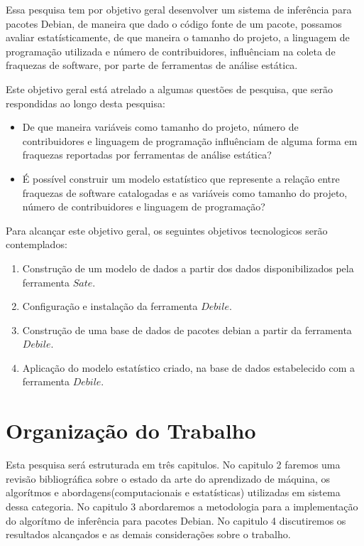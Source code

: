         Essa pesquisa tem por objetivo geral desenvolver um sistema de inferência para pacotes Debian, de maneira que dado o código fonte de um pacote, possamos avaliar estatísticamente, de que maneira o tamanho do projeto, a linguagem de programação utilizada e número de contribuidores, influênciam na coleta de fraquezas de software, por parte de ferramentas de análise estática.

        Este objetivo geral está atrelado a algumas questões de pesquisa, que serão respondidas ao longo desta pesquisa:
        \begin{itemize}
                \item De que maneira variáveis como tamanho do projeto, número de contribuidores e linguagem de programação influênciam de alguma forma em fraquezas reportadas por ferramentas de análise estática?
                \item É possível construir um modelo estatístico que represente a relação entre fraquezas de software catalogadas e as variáveis como tamanho do projeto, número de contribuidores e linguagem de programação?
        \end{itemize}

        Para alcançar este objetivo geral, os seguintes objetivos tecnologicos serão contemplados:
                \begin{enumerate}
                        \item Construção de um modelo de dados a partir dos dados disponibilizados pela ferramenta $Sate$.
                        \item Configuração e instalação da ferramenta $Debile$.
                        \item Construção de uma base de dados de pacotes debian a partir da ferramenta $Debile$.
                        \item Aplicação do modelo estatístico criado, na base de dados estabelecido com a ferramenta $Debile$.
                \end{enumerate}

\section{Organização do Trabalho}

        Esta pesquisa será estruturada em três capitulos. No capitulo 2 faremos uma revisão bibliográfica sobre o estado da arte do aprendizado de máquina, os algorítmos e abordagens(computacionais e estatísticas) utilizadas em sistema dessa categoria. No capitulo 3 abordaremos a metodologia para a implementação do algorítmo de inferência para pacotes Debian. No capitulo 4 discutiremos os resultados alcançados e as demais considerações sobre o trabalho.
